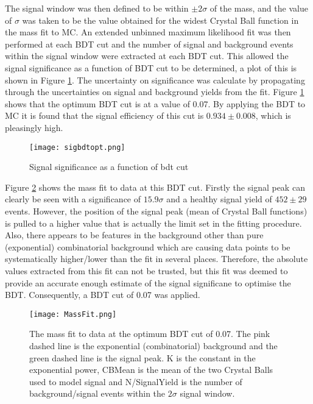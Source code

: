   The signal window was then defined to be within $\pm2\sigma$ of the \Bd mass, and the value of $\sigma$ was taken to be the value obtained for the widest Crystal Ball function in the mass fit to MC. An extended unbinned maximum likelihood fit was then performed at each BDT cut and the number of signal and background events within the signal window were extracted at each BDT cut.  This allowed the signal significance as a function of BDT cut to be determined, a plot of this is shown in Figure \ref{fig:bdtsigopt}.  The uncertainty on significance was calculate by propagating through the uncertainties on signal and background yields from the fit.  Figure \ref{fig:bdtsigopt} shows that the optimum BDT cut is at a value of 0.07.  By applying the BDT to MC it is found that the signal efficiency of this cut is $0.934\pm0.008$, which is pleasingly high.

\begin{figure}[h]
  \centering
  \texttt{[image: sigbdtopt.png]}
  \caption{Signal significance as a function of bdt cut}
  \label{fig:bdtsigopt}
\end{figure}

Figure \ref{fig:massfit} shows the mass fit to data at this BDT cut.  Firstly the signal peak can clearly be seen with a significance of $15.9\sigma$ and a healthy signal yield of $452\pm29$ events.  However, the position of the signal peak (mean of Crystal Ball functions) is pulled to a higher value that is actually the limit set in the fitting procedure.  Also, there appears to be features in the background other than pure (exponential) combinatorial background which are causing data points to be systematically higher/lower than the fit in several places.  Therefore, the absolute values extracted from this fit can not be trusted, but this fit was deemed to provide an accurate enough estimate of the signal significane to optimise the BDT.  Consequently, a BDT cut of 0.07 was applied.

\begin{figure}[h]
  \centering
  \texttt{[image: MassFit.png]}
  \caption{The mass fit to data at the optimum BDT cut of 0.07.  The pink dashed line is the exponential (combinatorial) background and the green dashed line is the signal peak.  K is the constant in the exponential power, CBMean is the mean of the two Crystal Balls used to model signal and N/SignalYield is the number of background/signal events within the $2\sigma$ signal window.}
  \label{fig:massfit}
\end{figure}


